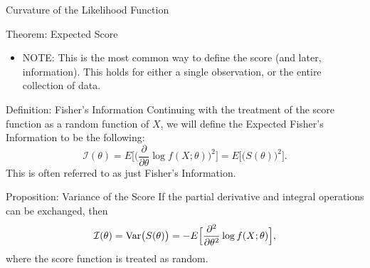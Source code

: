 \begin{frame}[allowframebreaks]{Curvature of the Likelihood Function}
\begin{itemize}
\begin{block}{Theorem: Expected Score}

  \end{block}

  \begin{itemize}
    \item \alert{NOTE:} This is the most common way to define the score (and later, information). This holds for either a single observation, or the entire collection of data.
  \end{itemize}

  \framebreak

  \begin{block}{Definition: Fisher's Information}
    Continuing with the treatment of the score function as a random function of $X$, we will define the Expected Fisher's Information to be the following:
    $$
    \mathcal{I}(\theta) = E\Big[\Big(\frac{\partial}{\partial \theta}\log f(X;\theta)\Big)^2\Big] = E\Big[\big(S(\theta)\big)^2\Big].
    $$
    This is often referred to as just Fisher's Information.
  \end{block}

  \begin{block}{Proposition: Variance of the Score}
    If the partial derivative and integral operations can be exchanged, then
    $$
    \mathcal{I}(\theta) = \mathrm{Var}\big(S(\theta)\big) = -E\Big[\frac{\partial^2}{\partial \theta^2} \log f(X;\theta)\Big],
    $$
    where the score function is treated as random.


\end{block}
\end{itemize}
\end{frame}
